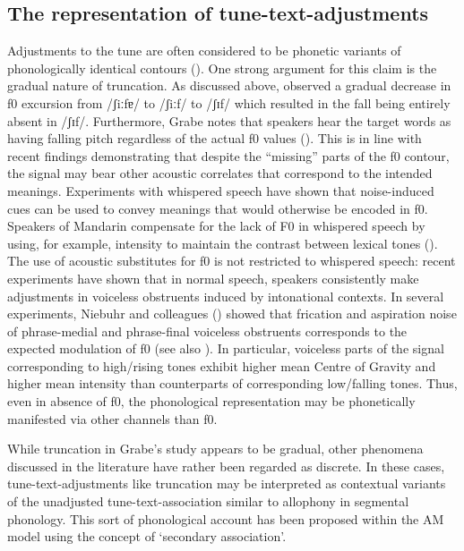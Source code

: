 \subsection{The representation of tune-text-adjustments}
Adjustments to the tune are often considered to be phonetic variants of phonologically identical contours (\citealt{Gronnum1989,Grabe1998,Grabe.etal2000,Hanssen.etal2007,Ladd2008}). One strong argument for this claim is the gradual nature of truncation. As discussed above, \citet{Grabe1998} observed a gradual decrease in f0 excursion from /ʃiːfɐ/ to /ʃiːf/ to /ʃɪf/ which resulted in the fall being entirely absent in /ʃɪf/. Furthermore, Grabe notes that speakers hear the target words as having falling pitch regardless of the actual f0 values (\citealt[140]{Grabe1998}). This is in line with recent findings demonstrating that despite the “missing” parts of the f0 contour, the signal may bear other acoustic correlates that correspond to the intended meanings. Experiments with whispered speech have shown that noise-induced cues can be used to convey meanings that would otherwise be encoded in f0. Speakers of Mandarin compensate for the lack of F0 in whispered speech by using, for example, intensity to maintain the contrast between lexical tones (\citealt{WhalenXu1992}). The use of acoustic substitutes for f0 is not restricted to whispered speech: recent experiments have shown that in normal speech, speakers consistently make adjustments in voiceless obstruents induced by intonational contexts. In several experiments, Niebuhr and colleagues (\citealt{Niebuhr2008,Niebuhr2009,Niebuhr2012,Niebuhr.etal2011}) showed that frication and aspiration noise of phrase-medial and phrase-final voiceless obstruents corresponds to the expected modulation of f0 (see also \citealt{RitterRoettger2014}). In particular, voiceless parts of the signal corresponding to high/rising tones exhibit higher mean Centre of Gravity and higher mean intensity than counterparts of corresponding low/falling tones. Thus, even in absence of f0, the phonological representation may be phonetically manifested via other channels than f0.

While truncation in Grabe’s study appears to be gradual, other phenomena discussed in the literature have rather been regarded as discrete. In these cases, tune-text-adjustments like truncation may be interpreted as contextual variants of the unadjusted tune-text-association similar to allophony in segmental phonology. This sort of phonological account has been proposed within the AM model using the concept of ‘secondary association’.

